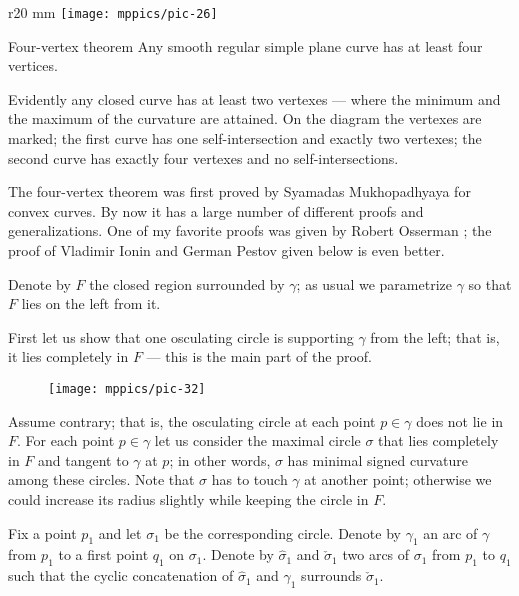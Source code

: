 {

\begin{wrapfigure}{r}{20 mm}
\vskip-0mm
\centering
\texttt{[image: mppics/pic-26]}
\vskip0mm
\end{wrapfigure}

\begin{thm}{Four-vertex theorem}\label{thm:4-vert}
Any smooth regular simple plane curve has at least four
vertices.
\end{thm}

Evidently any closed curve has at least two vertexes --- where the minimum and the maximum of the curvature are attained.
On the diagram the vertexes are marked;
the first curve has one self-intersection and exactly two vertexes;
the second curve has exactly four vertexes and no self-intersections.

}

The four-vertex theorem was first proved by Syamadas Mukhopadhyaya \cite{mukhopadhyaya} for convex curves.
By now it has a large number of different proofs and generalizations.
One of my favorite proofs was given by Robert Osserman \cite{osserman};
the proof of Vladimir Ionin and German Pestov given below is even better.

Denote by $F$ the closed region surrounded by $\gamma$;
as usual we parametrize $\gamma$ so that $F$ lies on the left from it.

First let us show that one osculating circle is supporting $\gamma$ from the left; that is, it lies completely in $F$ --- this is the main part of the proof.

\begin{figure}[h!]%
\vskip-0mm
\centering
\texttt{[image: mppics/pic-32]}
\vskip0mm
\end{figure}

Assume contrary; that is, the osculating circle at each point $p\in \gamma$ does not lie in $F$.
For each point $p\in\gamma$ let us consider the maximal circle $\sigma$ that lies completely in $F$ and tangent to $\gamma$ at $p$;
in other words, $\sigma$ has minimal signed curvature among these circles.
Note that $\sigma$ has to touch $\gamma$ at another point;
otherwise we could increase its radius slightly while keeping the circle in $F$.

Fix a point $p_1$ and let $\sigma_1$ be the corresponding circle.
Denote by $\gamma_1$ an arc of $\gamma$ from $p_1$ to a first point $q_1$ on $\sigma_1$.
Denote by $\hat\sigma_1$ and $\check\sigma_1$ two arcs of $\sigma_1$ from $p_1$ to $q_1$ such that the cyclic concatenation of $\hat\sigma_1$ and $\gamma_1$ surrounds $\check\sigma_1$.

